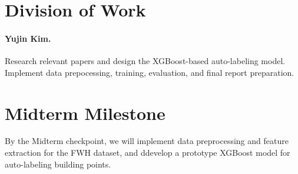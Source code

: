 \documentclass{article}
\begin{document}
\section{Division of Work}

\paragraph{Yujin Kim.} Research relevant papers and design the XGBoost-based auto-labeling model. Implement data prepocessing, training, evaluation, and final report preparation.


\section{Midterm Milestone}

By the Midterm checkpoint, we will implement data preprocessing and feature extraction for the FWH dataset, and ddevelop a prototype XGBoost model for auto-labeling building points.
\end{document}
